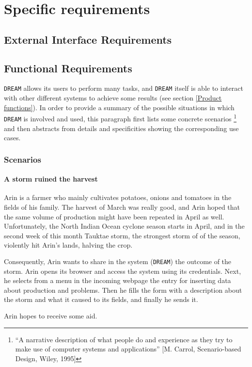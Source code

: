 \documentclass{article}
\begin{document}
\section{Specific requirements}
\subsection{External Interface Requirements}
\subsection{Functional Requirements}
\verb |DREAM| allows its users to perform many tasks, and \verb |DREAM| itself is able to interact with other different systems to achieve some results (see section \ref{Product functions}). In order to provide a summary of the possible situations in which \verb |DREAM| is involved and used, this paragraph first lists some concrete scenarios \footnote{“A narrative description of what people do and experience as
they try to make use of computer systems and applications” [M.
Carrol, Scenario-based Design, Wiley, 1995]} and then abstracts from details and specificities showing the corresponding use cases.
\subsubsection{Scenarios}
\paragraph{A storm ruined the harvest}
Arin is a farmer who mainly cultivates potatoes, onions and tomatoes in the fields of his family. The harvest of March was really good, and Arin hoped that the same volume of production might have been repeated in April as well. Unfortunately, the North Indian Ocean cyclone season starts in April, and in the second week of this month Tauktae storm, the strongest storm of of the season, violently hit Arin's lands, halving the crop.\par
\noindent Consequently, Arin wants to share in the system (\verb|DREAM|) the outcome of the storm. Arin opens its browser and access the system using its credentials. Next, he selects from a menu in the incoming webpage the entry for inserting data about production and problems. Then he fills the form with a description about the storm and what it caused to its fields, and finally he sends it.\par
\noindent Arin hopes to receive some aid.
\end{document}
